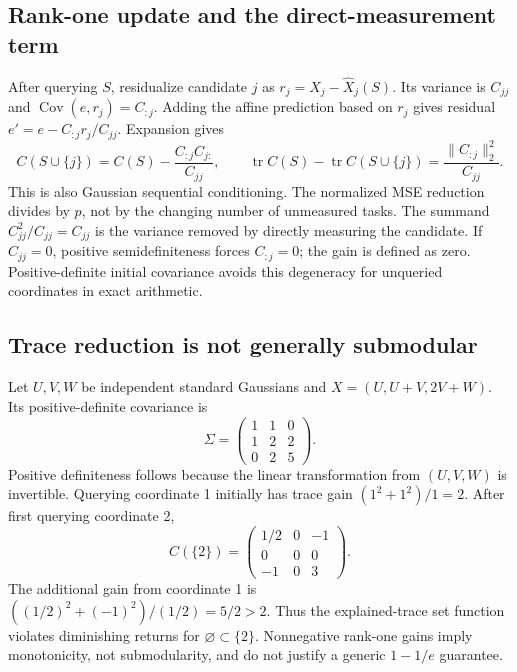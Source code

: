 \documentclass{article}
\newcommand{\tr}{\operatorname{tr}}
\newcommand{\Cov}{\operatorname{Cov}}
\begin{document}
\subsection{Rank-one update and the direct-measurement term}
After querying $S$, residualize candidate $j$ as $r_j=X_j-\widehat X_j(S)$. Its variance is $C_{jj}$ and $\Cov(e,r_j)=C_{:j}$. Adding the affine prediction based on $r_j$ gives residual $e'=e-C_{:j}r_j/C_{jj}$. Expansion gives
\begin{equation}
 C(S\cup\{j\})=C(S)-\frac{C_{:j}C_{j:}}{C_{jj}},\qquad
 \tr C(S)-\tr C(S\cup\{j\})=\frac{\|C_{:j}\|_2^2}{C_{jj}}.
\end{equation}
This is also Gaussian sequential conditioning. The normalized MSE reduction divides by $p$, not by the changing number of unmeasured tasks. The summand $C_{jj}^2/C_{jj}=C_{jj}$ is the variance removed by directly measuring the candidate. If $C_{jj}=0$, positive semidefiniteness forces $C_{:j}=0$; the gain is defined as zero. Positive-definite initial covariance avoids this degeneracy for unqueried coordinates in exact arithmetic.

\subsection{Trace reduction is not generally submodular}
\label{app:counterexample}
Let $U,V,W$ be independent standard Gaussians and $X=(U,U+V,2V+W)$. Its positive-definite covariance is
\begin{equation}
 \Sigma=\begin{pmatrix}1&1&0\\1&2&2\\0&2&5\end{pmatrix}.
\end{equation}
Positive definiteness follows because the linear transformation from $(U,V,W)$ is invertible. Querying coordinate 1 initially has trace gain $(1^2+1^2)/1=2$. After first querying coordinate 2,
\begin{equation}
 C(\{2\})=\begin{pmatrix}1/2&0&-1\\0&0&0\\-1&0&3\end{pmatrix}.
\end{equation}
The additional gain from coordinate 1 is $((1/2)^2+(-1)^2)/(1/2)=5/2>2$. Thus the explained-trace set function violates diminishing returns for $\varnothing\subset\{2\}$. Nonnegative rank-one gains imply monotonicity, not submodularity, and do not justify a generic $1-1/e$ guarantee.
\end{document}
